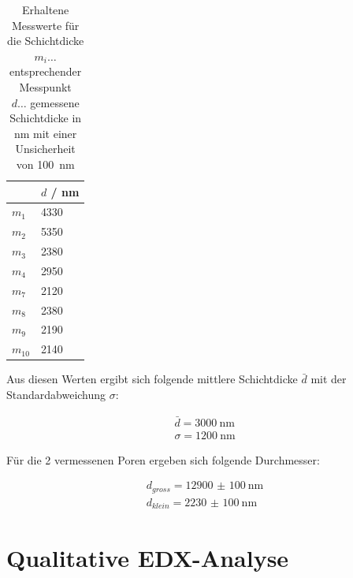 \documentclass[12pt,english,ngerman]{scrartcl}
\begin{document}
\begin{table}[H]
	\caption[Erhaltene Messwerte für die Schichtdicke]{Erhaltene Messwerte für die Schichtdicke\\
	$m_i \dots$ entsprechender Messpunkt\\
	$d \dots$ gemessene Schichtdicke in nm mit einer Unsicherheit von \SI{100}{\nano\m}}
	\begin{center}
	\begin{tabular}{|l|l|}
	\hline
	                 & $d$ / nm         \\ \hline
	$m_{1}$          & \SI{4330}{}      \\ \hline
	$m_{2}$          & \SI{5350}{}      \\ \hline
	$m_{3}$          & \SI{2380}{}      \\ \hline
	$m_{4}$          & \SI{2950}{}      \\ \hline
	$m_{7}$          & \SI{2120}{}      \\ \hline
	$m_{8}$          & \SI{2380}{}      \\ \hline
	$m_{9}$          & \SI{2190}{}      \\ \hline
	$m_{10}$         & \SI{2140}{}      \\ \hline

	\end{tabular}
	\end{center}
	\label{tab:messwerte}
\end{table}


Aus diesen Werten ergibt sich folgende mittlere Schichtdicke $\bar{d}$ mit der Standardabweichung $\sigma$:

\begin{align*}
	\bar{d} = \SI{3000}{\nano\m} \\
	\sigma = \SI{1200}{\nano\m}
\end{align*}

Für die 2 vermessenen Poren ergeben sich folgende Durchmesser:

\begin{align*}
	d_{gross} = \SI{12900(100)}{\nano\m} \\
	d_{klein} = \SI{2230(100)}{\nano\m}
\end{align*}


\section{Qualitative EDX-Analyse}
\end{document}
